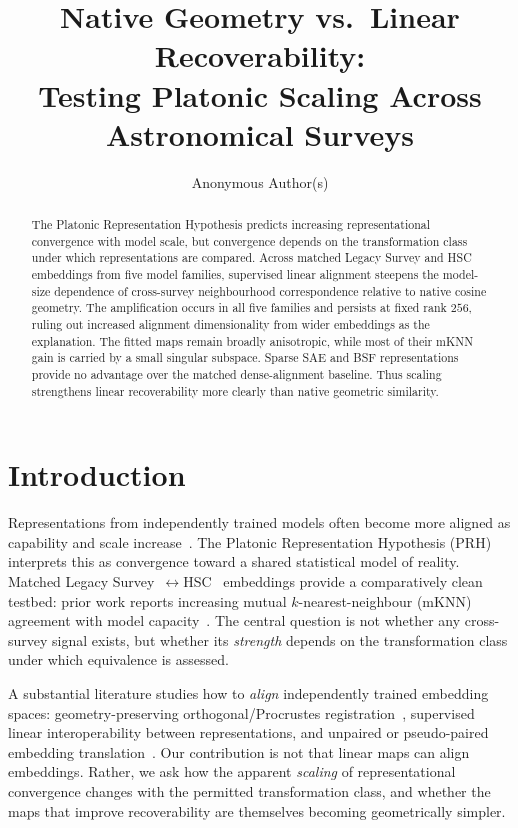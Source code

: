 \documentclass{article}
\title{Native Geometry vs.\ Linear Recoverability:\\
Testing Platonic Scaling Across Astronomical Surveys}
\author{Anonymous Author(s)}
\begin{document}
\maketitle

\begin{abstract}
The Platonic Representation Hypothesis predicts increasing representational convergence with model scale, but convergence depends on the transformation class under which representations are compared.
Across matched Legacy Survey and HSC embeddings from five model families, supervised linear alignment steepens the model-size dependence of cross-survey neighbourhood correspondence relative to native cosine geometry.
The amplification occurs in all five families and persists at fixed rank \(256\), ruling out increased alignment dimensionality from wider embeddings as the explanation.
The fitted maps remain broadly anisotropic, while most of their mKNN gain is carried by a small singular subspace.
Sparse SAE and BSF representations provide no advantage over the matched dense-alignment baseline.
Thus scaling strengthens linear recoverability more clearly than native geometric similarity.
\end{abstract}

\section{Introduction}\label{sec:intro}

Representations from independently trained models often become more aligned as capability and scale increase~\citep{huh2024platonic}.
The Platonic Representation Hypothesis (PRH) interprets this as convergence toward a shared statistical model of reality.
Matched Legacy Survey~\citep{dey2019legacy}\(\leftrightarrow\)HSC~\citep{miyazaki2018hsc} embeddings provide a comparatively clean testbed: prior work reports increasing mutual \(k\)-nearest-neighbour (mKNN) agreement with model capacity~\citep{duraphe2025platonicuniverse}.
The central question is not whether any cross-survey signal exists, but whether its \emph{strength} depends on the transformation class under which equivalence is assessed.

A substantial literature studies how to \emph{align} independently trained embedding spaces: geometry-preserving orthogonal/Procrustes registration~\citep{mikolov2013exploiting}, supervised linear interoperability between representations, and unpaired or pseudo-paired embedding translation~\citep{lample2018word,moschella2023relative,jha2025vec2vec}.
Our contribution is not that linear maps can align embeddings.
Rather, we ask how the apparent \emph{scaling} of representational convergence changes with the permitted transformation class, and whether the maps that improve recoverability are themselves becoming geometrically simpler.
\end{document}
